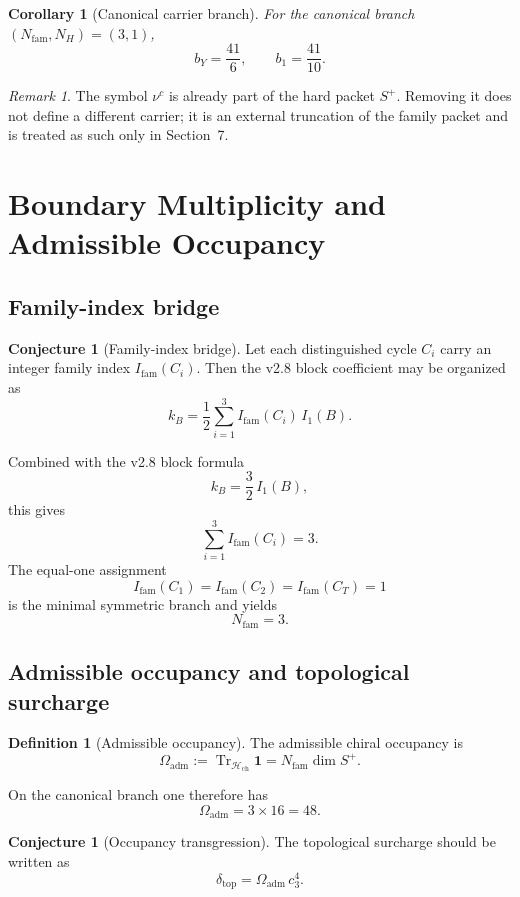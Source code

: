\documentclass[11pt,a4paper]{article}
\newtheorem{corollary}[theorem]{Corollary}
\theoremstyle{definition}
\newtheorem{definition}[theorem]{Definition}
\newtheorem{conjecture}[theorem]{Conjecture}
\theoremstyle{remark}
\newtheorem*{remark}{Remark}
\newcommand{\cthree}{c_3}
\newcommand{\deltatop}{\delta_{\mathrm{top}}}
\newcommand{\bone}{b_1}
\newcommand{\tr}{\operatorname{Tr}}
\newcommand{\Hch}{\mathcal H_{\mathrm{ch}}}
\newcommand{\Oadm}{\Omega_{\mathrm{adm}}}
\begin{document}
\begin{corollary}[Canonical carrier branch]
For the canonical branch $(N_{\mathrm{fam}},N_H)=(3,1)$,
\[
b_Y=\frac{41}{6},
\qquad
\bone=\frac{41}{10}.
\]
\end{corollary}

\begin{remark}
The symbol $\nu^c$ is already part of the hard packet $S^+$. Removing it does not define a different carrier; it is an external truncation of the family packet and is treated as such only in Section~7.
\end{remark}

\section{Boundary Multiplicity and Admissible Occupancy}

\subsection{Family-index bridge}

\begin{conjecture}[Family-index bridge]
Let each distinguished cycle $C_i$ carry an integer family index $I_{\mathrm{fam}}(C_i)$. Then the v2.8 block coefficient may be organized as
\[
k_B = \frac12\sum_{i=1}^{3} I_{\mathrm{fam}}(C_i)\,I_1(B).
\]
\end{conjecture}

Combined with the v2.8 block formula
\[
k_B=\frac32\,I_1(B),
\]
this gives
\[
\sum_{i=1}^{3} I_{\mathrm{fam}}(C_i)=3.
\]
The equal-one assignment
\[
I_{\mathrm{fam}}(C_1)=I_{\mathrm{fam}}(C_2)=I_{\mathrm{fam}}(C_T)=1
\]
is the minimal symmetric branch and yields
\[
N_{\mathrm{fam}}=3.
\]

\subsection{Admissible occupancy and topological surcharge}

\begin{definition}[Admissible occupancy]
The admissible chiral occupancy is
\[
\Oadm := \tr_{\Hch}\mathbf 1 = N_{\mathrm{fam}}\dim S^+.
\]
\end{definition}

On the canonical branch one therefore has
\[
\Oadm = 3\times 16 = 48.
\]

\begin{conjecture}[Occupancy transgression]
The topological surcharge should be written as
\[
\deltatop = \Oadm\,\cthree^4.
\]
\end{conjecture}
\end{document}
